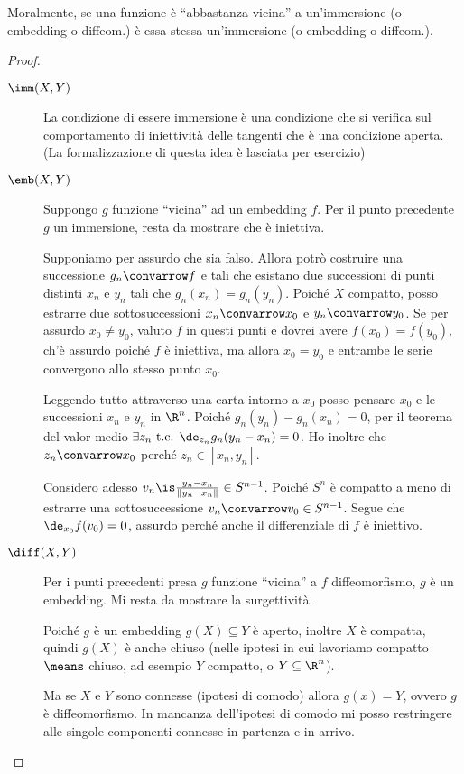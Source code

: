Moralmente, se una funzione è ``abbastanza vicina'' a un'immersione (o embedding o diffeom.) è essa stessa un'immersione (o embedding o diffeom.).
\begin{proof}
\noindent
\begin{description}
\item [$\imm(X,Y)$] La condizione di essere immersione è una condizione che si verifica sul comportamento di iniettività delle tangenti che è una condizione aperta. (La formalizzazione di questa idea è lasciata per esercizio)
\item [$\emb(X,Y)$] Suppongo $g$ funzione ``vicina'' ad un embedding $f$. Per il punto precedente $g$ un immersione, resta da mostrare che è iniettiva. 

Supponiamo per assurdo che sia falso. Allora potrò costruire una successione $g_n \convarrow f$ e tali che esistano due successioni di punti distinti $x_n$ e $y_n$ tali che $g_n(x_n) = g_n(y_n)$. 
Poiché $X$ compatto, posso estrarre due sottosuccessioni $x_n \convarrow x_0$ e $y_n \convarrow y_0$. Se per assurdo $x_0 \neq y_0$, valuto $f$ in questi punti e dovrei avere $f(x_0)=f(y_0)$, ch'è assurdo poiché $f$ è iniettiva, ma allora $x_0=y_0$ e entrambe le serie convergono allo stesso punto $x_0$.

Leggendo tutto attraverso una carta intorno a $x_0$ posso pensare $x_0$ e le successioni $x_n$ e $y_n$ in $\R^n$.
Poiché $g_n(y_n)-g_n(x_n)=0$, per il teorema del valor medio $\exists z_n \text{ t.c. } \de_{z_n}g_n(y_n-x_n)=0$.
Ho inoltre che $z_n \convarrow x_0$ perché $z_n \in [x_n,y_n]$.

Considero adesso $v_n \is \frac{y_n-x_n}{\left \|y_n - x_n \right \|} \in S^{n-1}$. Poiché $S^n$ è compatto a meno di estrarre una sottosuccessione $v_n \convarrow v_0 \in S^{n-1}$.
Segue che $\de_{x_0}f(v_0)=0$,
assurdo perché anche il differenziale di $f$ è iniettivo. \absurd
\item [$\diff(X,Y)$] Per i punti precedenti presa $g$ funzione ``vicina'' a $f$ diffeomorfismo, $g$ è un embedding. Mi resta da mostrare la surgettività.

Poiché $g$ è un embedding $g(X) \subseteq Y$ è aperto, inoltre $X$ è compatta, quindi $g(X)$ è anche chiuso (nelle ipotesi in cui lavoriamo compatto $\means$ chiuso, ad esempio $Y$ compatto, o $Y \subseteq \R^n$).

Ma se $X$ e $Y$ sono connesse (ipotesi di comodo) allora $g(x) = Y$, ovvero $g$ è diffeomorfismo. In mancanza dell'ipotesi di comodo mi posso restringere alle singole componenti connesse in partenza e in arrivo.
\qedhere
\end{description}
\end{proof}


